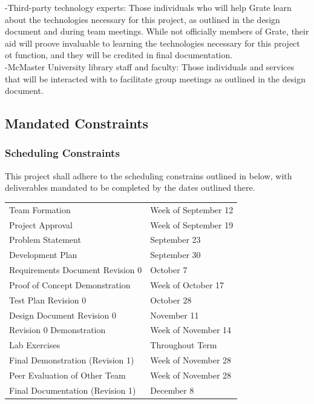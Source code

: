 \documentclass[12pt, titlepage]{article}
\begin{document}
-Third-party technology experts: Those individuals who will help Grate learn 
about the technologies necessary for this project, as outlined in the design 
document and during team meetings. While not officially members of Grate, their 
aid will proove invaluable to learning the technologies necessary for this 
project ot function, and they will be credited in final documentation.\\

-McMaster University library staff and faculty: Those individuals and services 
that will be interacted with to facilitate group meetings as outlined in the 
design document.

\subsection{Mandated Constraints}

\subsubsection{Scheduling Constraints}

This project shall adhere to the scheduling constrains outlined in below, with 
deliverables mandated to be completed by the dates outlined there.

\begin{tabular}{ p{6.7cm} l}

  Team Formation & Week of September 12\\

  Project Approval & Week of September 19\\

  Problem Statement & September 23\\

  Development Plan & September 30\\

  Requirements Document Revision 0 & October 7\\

  Proof of Concept Demonstration & Week of October 17\\

  Test Plan Revision 0 & October 28\\

  Design Document Revision 0 & November 11\\

  Revision 0 Demonstration & Week of November 14\\

  Lab Exercises & Throughout Term\\

  Final Demonstration (Revision 1) & Week of November 28\\

  Peer Evaluation of Other Team & Week of November 28\\

  Final Documentation (Revision 1) & December 8\\

\end{tabular}
\end{document}
